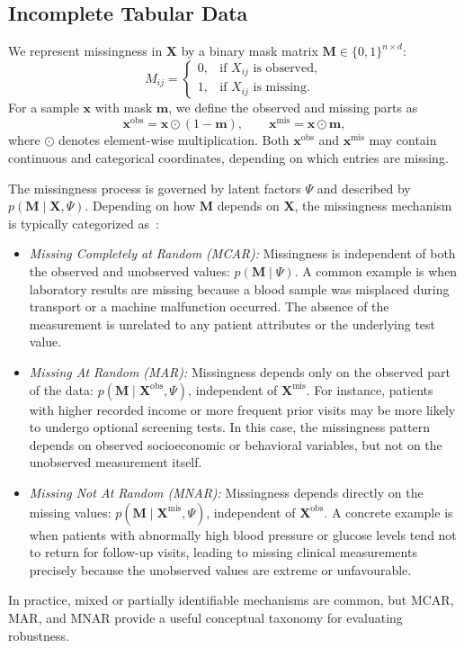 \documentclass[times, review, 10pt]{elsarticle}
\begin{document}
\subsection{Incomplete Tabular Data}

We represent missingness in $\mathbf{X}$ by a binary mask matrix $\mathbf{M} \in \{0,1\}^{n \times d}$:
\[
M_{ij} =
\begin{cases}
0, & \text{if } X_{ij} \text{ is observed}, \\
1, & \text{if } X_{ij} \text{ is missing}.
\end{cases}
\]
For a sample $\mathbf{x}$ with mask $\mathbf{m}$, we define the observed and missing parts as
\[
\mathbf{x}^{\mathrm{obs}} = \mathbf{x} \odot (1 - \mathbf{m}),
\qquad
\mathbf{x}^{\mathrm{mis}} = \mathbf{x} \odot \mathbf{m},
\]
where $\odot$ denotes element-wise multiplication. Both $\mathbf{x}^{\mathrm{obs}}$ and $\mathbf{x}^{\mathrm{mis}}$ may contain continuous and categorical coordinates, depending on which entries are missing.

The missingness process is governed by latent factors $\Psi$ and described by $p(\mathbf{M}\mid \mathbf{X}, \Psi)$. Depending on how $\mathbf{M}$ depends on $\mathbf{X}$, the missingness mechanism is typically categorized as~\cite{MNAR}:
\begin{itemize}

\item \textit{Missing Completely at Random (MCAR):} Missingness is independent of both the observed and unobserved values: $p(\mathbf{M}\mid \Psi)$. A common example is when laboratory results are missing because a blood sample was misplaced during transport or a machine malfunction occurred. The absence of the measurement is unrelated to any patient attributes or the underlying test value.

\item \textit{Missing At Random (MAR):} Missingness depends only on the observed part of the data: $p(\mathbf{M}\mid \mathbf{X}^{\mathrm{obs}},\Psi)$, independent of $\mathbf{X}^{\mathrm{mis}}$. For instance, patients with higher recorded income or more frequent prior visits may be more likely to undergo optional screening tests. In this case, the missingness pattern depends on observed socioeconomic or behavioral variables, but not on the unobserved measurement itself.

\item \textit{Missing Not At Random (MNAR):} Missingness depends directly on the missing values: $
p(\mathbf{M}\mid \mathbf{X}^{\mathrm{mis}},\Psi)$, independent of $\mathbf{X}^{\mathrm{obs}}$. A concrete example is when patients with abnormally high blood pressure or glucose levels tend not to return for follow-up visits, leading to missing clinical measurements precisely because the unobserved values are extreme or unfavourable.

\end{itemize}
In practice, mixed or partially identifiable mechanisms are common, but MCAR, MAR, and MNAR provide a useful conceptual taxonomy for evaluating robustness.
\end{document}
